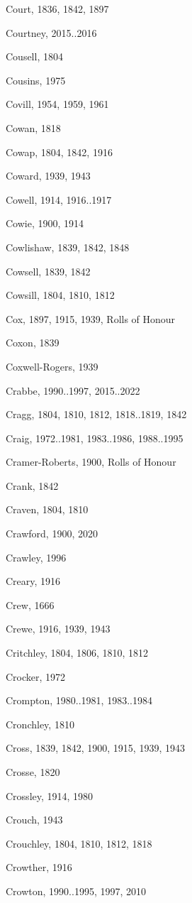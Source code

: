 \begin{theindex}
\item Court, 1836, 1842, 1897
\item Courtney, 2015..2016
\item Cousell, 1804
\item Cousins, 1975
\item Covill, 1954, 1959, 1961
\item Cowan, 1818
\item Cowap, 1804, 1842, 1916
\item Coward, 1939, 1943
\item Cowell, 1914, 1916..1917
\item Cowie, 1900, 1914
\item Cowlishaw, 1839, 1842, 1848
\item Cowsell, 1839, 1842
\item Cowsill, 1804, 1810, 1812
\item Cox, 1897, 1915, 1939, Rolls of Honour
\item Coxon, 1839
\item Coxwell-Rogers, 1939
\item Crabbe, 1990..1997, 2015..2022
\item Cragg, 1804, 1810, 1812, 1818..1819, 1842
\item Craig, 1972..1981, 1983..1986, 1988..1995
\item Cramer-Roberts, 1900, Rolls of Honour
\item Crank, 1842
\item Craven, 1804, 1810
\item Crawford, 1900, 2020
\item Crawley, 1996
\item Creary, 1916
\item Crew, 1666
\item Crewe, 1916, 1939, 1943
\item Critchley, 1804, 1806, 1810, 1812
\item Crocker, 1972
\item Crompton, 1980..1981, 1983..1984
\item Cronchley, 1810
\item Cross, 1839, 1842, 1900, 1915, 1939, 1943
\item Crosse, 1820
\item Crossley, 1914, 1980
\item Crouch, 1943
\item Crouchley, 1804, 1810, 1812, 1818
\item Crowther, 1916
\item Crowton, 1990..1995, 1997, 2010

\end{theindex}
